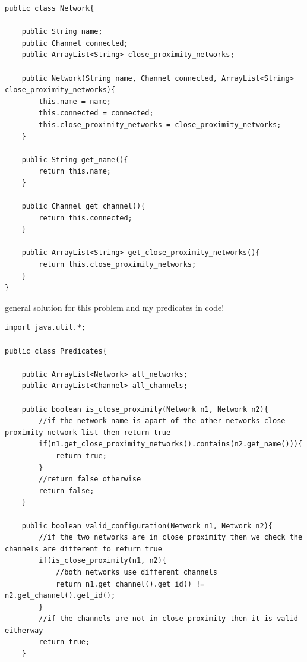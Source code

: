 \documentclass{article}
\begin{document}
\begin{enumerate}[(a)]
\begin{enumerate}[(i)]
\begin{lstlisting}
public class Network{

    public String name;
    public Channel connected;
    public ArrayList<String> close_proximity_networks;
    
    public Network(String name, Channel connected, ArrayList<String> close_proximity_networks){
        this.name = name;
        this.connected = connected;
        this.close_proximity_networks = close_proximity_networks;
    }
    
    public String get_name(){
        return this.name;
    }
    
    public Channel get_channel(){
        return this.connected;
    }
    
    public ArrayList<String> get_close_proximity_networks(){
        return this.close_proximity_networks;
    }
}
            \end{lstlisting}
            
            \newpage
            general solution for this problem and my predicates in code!
            \begin{lstlisting}
import java.util.*;

public class Predicates{

    public ArrayList<Network> all_networks;
    public ArrayList<Channel> all_channels;
    
    public boolean is_close_proximity(Network n1, Network n2){
        //if the network name is apart of the other networks close proximity network list then return true
        if(n1.get_close_proximity_networks().contains(n2.get_name())){
            return true;
        }
        //return false otherwise
        return false;
    }
    
    public boolean valid_configuration(Network n1, Network n2){
        //if the two networks are in close proximity then we check the channels are different to return true
        if(is_close_proximity(n1, n2){
            //both networks use different channels
            return n1.get_channel().get_id() != n2.get_channel().get_id();
        }
        //if the channels are not in close proximity then it is valid eitherway
        return true;
    }
    

\end{lstlisting}
\end{enumerate}
\end{enumerate}
\end{document}
